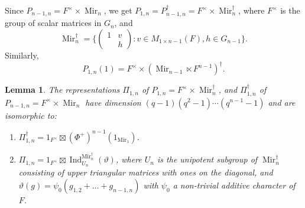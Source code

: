 \documentclass[reqno]{amsart}
\newtheorem{lemma}[theorem]{Lemma}
\theoremstyle{definition}
\theoremstyle{remark}
\numberwithin{equation}{section}
\DeclareMathOperator{\Ind}{Ind}
\DeclareMathOperator{\Mir}{Mir}
\newcommand{\bbsm}{\left (\begin{smallmatrix}}      \newcommand{\besm}{\end{smallmatrix}\right )}
\begin{document}
Since $P_{n-1,n}=F^\times \times \Mir_n$, we get $P_{1,n}=P_{n-1,n}^\dagger=F^\times \times \Mir_n^\dagger$, where $F^\times$ is the group of scalar matrices in $G_n$, and
\[ \Mir_n^\dagger = \{\bbsm 1 & v\\ & h \besm  \colon v \in M_{1 \times n-1}(F), h \in G_{n-1} \}. \]
Similarly, 
\[P_{1,n}(1)=F^\times \times (\Mir_{n-1} \ltimes F^{n-1} )^\dagger.\]
\begin{lemma} \label{Pi_1_n_Mir} The representations
$\Pi_{1,n}$ of $P_{1,n}=F^\times \times \Mir_n^\dagger$, and 
$\Pi_{1,n}^\dagger$ of $P_{n-1,n}=F^\times \times \Mir_n$ have dimension $(q-1)(q^2-1) \cdots(q^{n-1}-1)$ and are isomorphic to:
\begin{enumerate}
    \item[\emph{(1)}]  $\Pi_{1,n}^\dagger= 1_{F^\times} \boxtimes (\Phi^+)^{n-1}(1_{\Mir_1})$.
    \item[\emph{(2)}] $\Pi_{1,n}=1_{F^\times} \boxtimes \Ind_{U_n}^{\Mir_n^\dagger}(\vartheta)$, where $U_n$ is the  unipotent subgroup of $\Mir_n^\dagger$ consisting of upper triangular matrices with ones on the diagonal, and $\vartheta(g)=\psi_0(g_{1,2}+ \dots+g_{n-1,n})$ with $\psi_0$ a non-trivial additive character of $F$.
    \end{enumerate}
\end{lemma}
\end{document}
